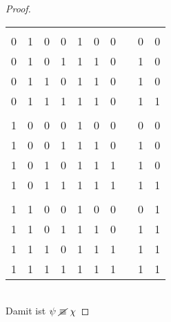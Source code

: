 \documentclass[a4paper,10pt]{article}
\begin{document}
\begin{compactenum} [(a)]
\begin{proof}
\begin{tabular}{cccc|c|c|c|c|c|c}
		   	&&&&&&&&&\\
		   	0 & 1 & 0 & 0 & 1 & 0 & 0 &  & 0 & 0\\
		   	0 & 1 & 0 & 1 & 1 & 1 & 0 &  & 1 & 0\\
		   	0 & 1 & 1 & 0 & 1 & 1 & 0 &  & 1 & 0\\
		   	0 & 1 & 1 & 1 & 1 & 1 & 0 &  & 1 & 1\\
		   	&&&&&&&&&\\
		   	1 & 0 & 0 & 0 & 1 & 0 & 0 &  & 0 & 0\\
		   	1 & 0 & 0 & 1 & 1 & 1 & 0 &  & 1 & 0\\
		   	1 & 0 & 1 & 0 & 1 & 1 & 1 &  & 1 & 0\\
		   	1 & 0 & 1 & 1 & 1 & 1 & 1 &  & 1 & 1\\
		   	&&&&&&&&&\\
		   	1 & 1 & 0 & 0 & 1 & 0 & 0 &  & 0 & 1\\
		   	1 & 1 & 0 & 1 & 1 & 1 & 0 &  & 1 & 1\\
		   	1 & 1 & 1 & 0 & 1 & 1 & 1 &  & 1 & 1\\
		   	1 & 1 & 1 & 1 & 1 & 1 & 1 &  & 1 & 1\\
		   \end{tabular}\\
			Damit ist $\psi \ \cancel{\equiv} \ \chi$
		\end{proof}
	\end{compactenum} \
\end{document}
